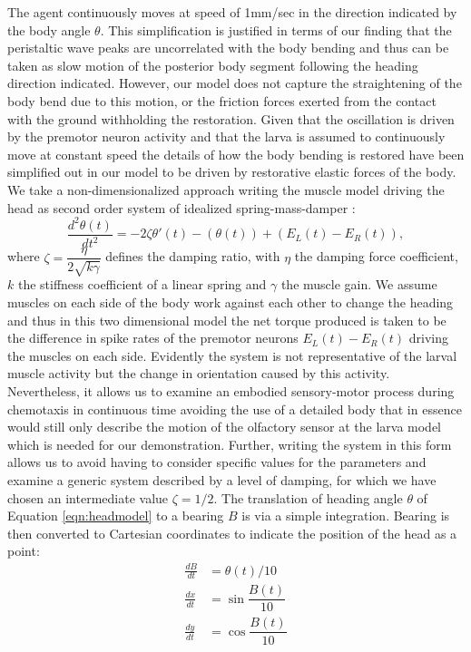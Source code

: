 \documentclass[11pt,a4paper]{article}
\begin{document}
The agent continuously moves at speed of 1mm/sec in the direction indicated by the body angle $\theta$. This simplification is justified in terms of our finding that the peristaltic wave peaks are uncorrelated with the body bending and thus can be taken as slow motion of the posterior body segment following the heading direction indicated. However, our model does not capture the straightening of the body bend due to this motion, or the friction forces exerted from the contact with the ground withholding the restoration. Given that the oscillation is driven by the premotor neuron activity and that the larva is assumed to continuously move at constant speed the details of how the body bending is restored have been simplified out in our model to be driven by restorative elastic forces of the body. 
 We take a non-dimensionalized approach writing the muscle model driving the head as second order system of idealized spring-mass-damper \cite[see][]{fung2013biomechanics}:
\begin{equation}
\label{eqn:headmodel}
\frac{d^2\theta(t)}{dt^2} = - 2 \zeta \theta'(t) - (\theta(t)) + (E_L(t) - E_R(t)),
\end{equation}
where $\zeta= \dfrac{\eta}{ 2\sqrt{k \gamma}}$ defines the damping ratio, with $\eta$ the damping force coefficient, $k$ the stiffness coefficient of a linear spring and $\gamma$ the muscle gain.
We assume muscles on each side of the body work against each other to change the heading and thus in this two dimensional model the net torque produced is taken to be the difference in spike rates of the premotor neurons $E_L(t) - E_R(t)$ driving the muscles on each side. 
Evidently the system is not representative of the larval muscle activity but the change in orientation caused by this activity.
 Nevertheless, it allows us to examine an embodied sensory-motor process during chemotaxis in continuous time avoiding the use of a detailed body that in essence would still only describe the motion of the olfactory sensor at the larva model which is needed for our demonstration.
 Further, writing the system in this form allows us to avoid having to consider specific values for the parameters and examine a generic system described by a level of damping, for which we have chosen an intermediate value $\zeta=1/2$.
The translation of heading angle $\theta$ of Equation \ref{eqn:headmodel} to a bearing $B$ is via a simple integration. Bearing is then converted to Cartesian coordinates to indicate the position of the head as a point:
\begin{align}
\frac{dB}{dt} &= \theta(t)/10 \\
\frac{dx}{dt} &= \sin{\dfrac{B(t)}{10}} \\
\frac{dy}{dt} &= \cos{\dfrac{B(t)}{10}}
\end{align}
   
\end{document}
